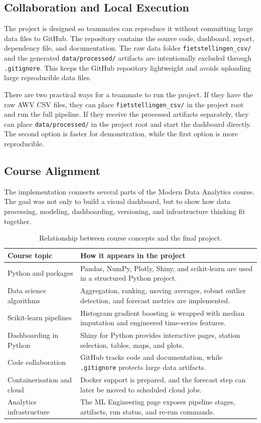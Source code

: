 \documentclass[11pt]{article}
\newcommand{\code}[1]{\texttt{#1}}
\begin{document}
\subsection{Collaboration and Local Execution}

The project is designed so teammates can reproduce it without committing large data files to GitHub. The repository contains the source code, dashboard, report, dependency file, and documentation. The raw data folder \code{fietstellingen\_csv/} and the generated \code{data/processed/} artifacts are intentionally excluded through \code{.gitignore}. This keeps the GitHub repository lightweight and avoids uploading large reproducible data files.

There are two practical ways for a teammate to run the project. If they have the raw AWV CSV files, they can place \code{fietstellingen\_csv/} in the project root and run the full pipeline. If they receive the processed artifacts separately, they can place \code{data/processed/} in the project root and start the dashboard directly. The second option is faster for demonstration, while the first option is more reproducible.

\subsection{Course Alignment}

The implementation connects several parts of the Modern Data Analytics course. The goal was not only to build a visual dashboard, but to show how data processing, modeling, dashboarding, versioning, and infrastructure thinking fit together.

\begin{table}[htbp]
\centering
\caption{Relationship between course concepts and the final project.}
\small
\begin{tabularx}{0.96\textwidth}{lX}
\toprule
\textbf{Course topic} & \textbf{How it appears in the project} \\
\midrule
Python and packages & Pandas, NumPy, Plotly, Shiny, and scikit-learn are used in a structured Python project. \\
Data science algorithms & Aggregation, ranking, moving averages, robust outlier detection, and forecast metrics are implemented. \\
Scikit-learn pipelines & Histogram gradient boosting is wrapped with median imputation and engineered time-series features. \\
Dashboarding in Python & Shiny for Python provides interactive pages, station selection, tables, maps, and plots. \\
Code collaboration & GitHub tracks code and documentation, while \code{.gitignore} protects large data artifacts. \\
Containerisation and cloud & Docker support is prepared, and the forecast step can later be moved to scheduled cloud jobs. \\
Analytics infrastructure & The ML Engineering page exposes pipeline stages, artifacts, run status, and re-run commands. \\
\bottomrule
\end{tabularx}
\end{table}
\end{document}
